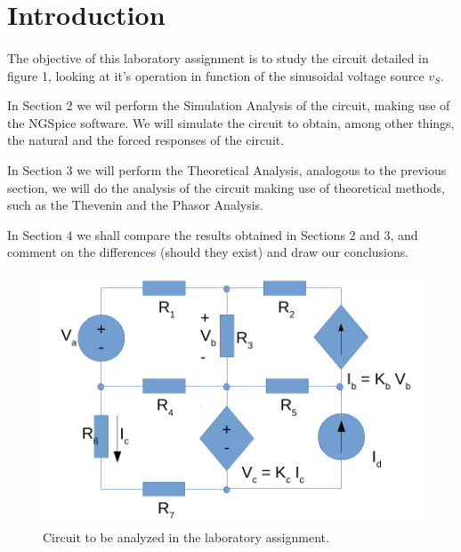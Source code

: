 \section{Introduction}
\label{sec:introduction}

\paragraph{} The objective of this laboratory assignment is to study the circuit detailed in figure 1, looking at it's operation in function of the sinusoidal voltage source $v_S$.

In Section 2 we wil perform the Simulation Analysis of the circuit, making use of the NGSpice software. We will simulate the circuit to obtain, among other things, the natural and the forced responses of the circuit.

In Section 3 we will perform the Theoretical Analysis, analogous to the previous section, we will do the analysis of the circuit making use of theoretical methods, such as the Thevenin and the Phasor Analysis.

In Section 4 we shall compare the results obtained in Sections 2 and 3, and comment on the differences (should they exist) and draw our conclusions. 

\begin{figure}[h] \centering
\includegraphics[width=0.5\linewidth]{circuit.pdf}
\caption{Circuit to be analyzed in the laboratory assignment.}
\label{fig:rc}
\end{figure}

